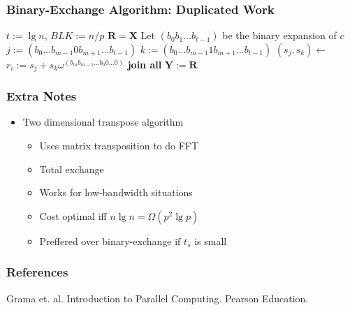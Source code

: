 \documentclass[xcolor=pdftex,dvipsnames,table]{presentation}
\begin{document}
\begin{frame}
	\frametitle{Binary-Exchange Algorithm: Duplicated Work}

	\begin{algorithmic}[1]
			\State $t:=\lg n$, $BLK:=n/p$
			\State $\mathbf{R}=\mathbf{X}$
						\State Let $(b_0b_1\ldots b_{t-1})$ be the binary expansion of $c$
						\State $j:=(b_0\ldots b_{m-1}0b_{m+1}\ldots b_{t-1})$
						\State $k:=(b_0\ldots b_{m-1}1b_{m+1}\ldots b_{t-1})$
						\State $(s_j,s_k)\gets$
						\State $r_i:= s_j+s_k\omega^{(b_mb_{m-1}\ldots b_0 0\ldots0)}$
					\EndFor
				\EndFor
			\EndSpawn
			\State \textbf{join all}
			\State $\mathbf{Y}:=\mathbf{R}$
		\EndFunction
	\end{algorithmic}
\end{frame}

\begin{frame}
	\frametitle{Extra Notes}

	\begin{itemize}
		\item Two dimensional transpose algorithm
		\begin{itemize}
			\item Uses matrix transposition to do FFT
			\item Total exchange
			\item Works for low-bandwidth situations
			\item Cost optimal iff $n\lg n = \Omega(p^2\lg p)$
			\item Preffered over binary-exchange if $t_s$ is small
		\end{itemize}
	\end{itemize}
\end{frame}

\begin{frame}[allowframebreaks]
\frametitle{References}
	\begin{thebibliography}{10}
		Grama et. al.
		\newblock{} Introduction to Parallel Computing.
		\newblock{} Pearson Education.
	\end{thebibliography}
\end{frame}
\end{document}
